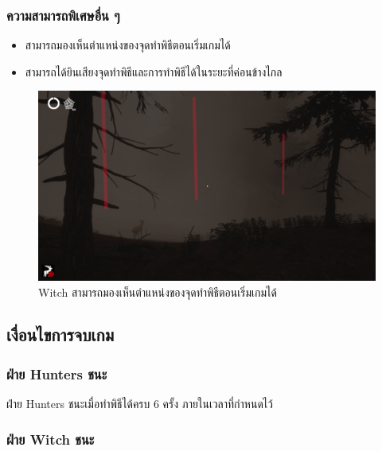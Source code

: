 \subsubsection{ความสามารถพิเศษอื่น ๆ}

\begin{itemize}
  \item สามารถมองเห็นตำแหน่งของจุดทำพิธีตอนเริ่มเกมได้
  \item สามารถได้ยินเสียงจุดทำพิธีและการทำพิธีได้ในระยะที่ค่อนข้างไกล
\end{itemize}

\begin{figure}[h]
  \begin{center}
  \includegraphics[width=\textwidth]{./img/mechanics/see_ritual.png}
  \end{center}
  \caption[Witch สามารถมองเห็นตำแหน่งของจุดทำพิธีตอนเริ่มเกมได้]{Witch สามารถมองเห็นตำแหน่งของจุดทำพิธีตอนเริ่มเกมได้}
  \label{Witch สามารถมองเห็นตำแหน่งของจุดทำพิธีตอนเริ่มเกมได้}
\end{figure}

\subsection{เงื่อนไขการจบเกม}

\subsubsection{ฝ่าย Hunters ชนะ}

ฝ่าย Hunters ชนะเมื่อทำพิธีได้ครบ 6 ครั้ง ภายในเวลาที่กำหนดไว้

\subsubsection{ฝ่าย Witch ชนะ} 

